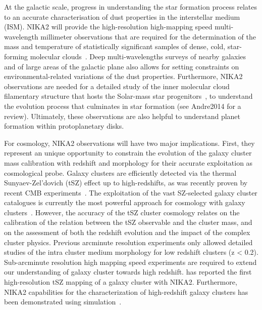 At the galactic scale, progress in understanding the star formation
process relates to an accurate characterisation of dust properties in
the interstellar medium (ISM). NIKA2 will provide the high-resolution
high-mapping speed multi-wavelength millimeter observations that are
required for the determination of the mass and temperature of
statistically significant samples of dense, cold, star-forming
molecular clouds~\citep{Rigby2018}.
Deep multi-wavelengths surveys of nearby galaxies and of large areas
of the galactic plane also allows for setting constraints on
environmental-related variations of the dust properties.
Furthermore, NIKA2 observations are needed for a
detailed study of the inner molecular cloud filamentary structure that
hosts the Solar-mass star progenitors~\citep{Bracco2017}, to
understand the evolution process that culminates in star
formation (see Andre2014 for a review). Ultimately, these
observations are also helpful to understand planet formation within
protoplanetary disks.

For cosmology, NIKA2 observations will have two major
implications. First, they represent an unique opportunity to constrain the
evolution of the galaxy cluster mass calibration with redshift and
morphology for their accurate exploitation as cosmological probe. 
Galaxy clusters are efficiently detected via the thermal
Sunyaev-Zel'dovich (tSZ) effect up to high-redshifts, as was recently
proven by recent CMB
experiments~\citep{Hasselfield2013_ACT_SZ, Reichardt2013_SPT_SZ, Planck2016_SZcat}.
The exploitation of the vast SZ-selected galaxy cluster catalogues is
currently the most powerful approach for cosmology with galaxy
clusters~\citep{Planck_2016_SZ_cosmo}. However, the accuracy of the tSZ cluster
cosmology relates on the calibration of the relation between the tSZ
observable and the cluster mass, and on the assessment of both the redshift
evolution and the impact of the complex cluster physics. 
Previous arcminute resolution experiments only allowed detailed studies
of the intra cluster medium morphology for low redshift clusters (z <
0.2). Sub-arcminute resolution high mapping speed experiments are
required to extend our understanding of galaxy cluster towards high
redshift. \citet{Ruppin2018} has reported the first high-resolution
tSZ mapping of a galaxy cluster with NIKA2. Furthermore, NIKA2
capabilities for the characterization of high-redshift galaxy clusters
has been demonstrated using simulation~\citep{Ruppin2019}.


